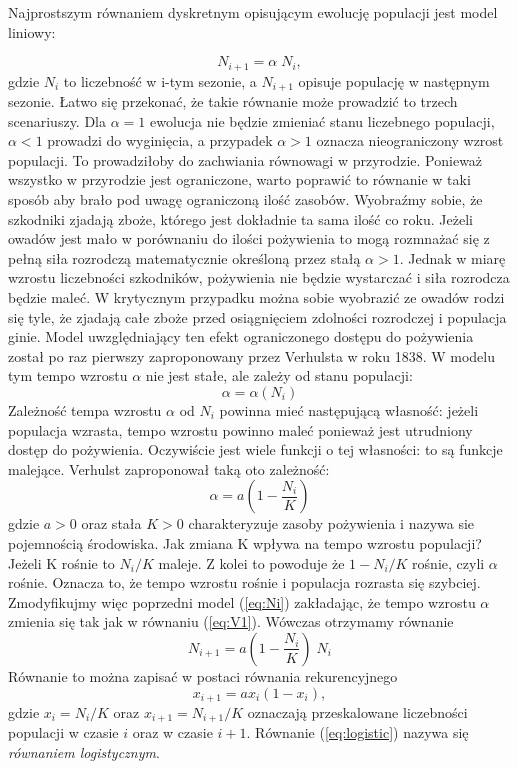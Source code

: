\documentclass[12pt]{article}
\begin{document}
Najprostszym równaniem dyskretnym opisującym ewolucję populacji jest
model liniowy:

\begin{equation}
\label{eq:Ni}
N_{i+1} = \alpha \; N_{i},
\end{equation}
%
gdzie $N_i$ to liczebność w i-tym sezonie, a $N_{i+1}$ opisuje
populację w następnym sezonie. Łatwo się przekonać, że takie równanie
może prowadzić to trzech scenariuszy.  Dla $\alpha=1$ ewolucja nie
będzie zmieniać stanu liczebnego populacji, $\alpha<1$ prowadzi do
wyginięcia, a przypadek $\alpha>1$ oznacza nieograniczony wzrost
populacji. To prowadziłoby do zachwiania równowagi w
przyrodzie. Ponieważ wszystko w przyrodzie jest ograniczone, warto
poprawić to równanie w taki sposób aby brało pod uwagę ograniczoną
ilość zasobów. Wyobraźmy sobie, że szkodniki zjadają zboże, którego
jest dokładnie ta sama ilość co roku. Jeżeli owadów jest mało w
porównaniu do ilości pożywienia to mogą rozmnażać się z pełną siła
rozrodczą matematycznie określoną przez stałą $\alpha>1$. Jednak w
miarę wzrostu liczebności szkodników, pożywienia nie będzie wystarczać
i siła rozrodcza będzie maleć. W krytycznym przypadku można sobie
wyobrazić ze owadów rodzi się tyle, że zjadają całe zboże przed
osiągnięciem zdolności rozrodczej i populacja ginie.  Model
uwzględniający ten efekt ograniczonego dostępu do pożywienia został po
raz pierwszy zaproponowany przez Verhulsta w roku 1838. W modelu tym
tempo wzrostu $\alpha$ nie jest stałe, ale zależy od stanu populacji:
%
\begin{equation}
\label{eq:V}
\alpha = \alpha( N_{i} )
\end{equation}
%
Zależność tempa wzrostu $\alpha$ od $N_i$ powinna mieć następującą
własność: jeżeli populacja wzrasta, tempo wzrostu powinno maleć
ponieważ jest utrudniony dostęp do pożywienia. Oczywiście jest wiele
funkcji o tej własności: to są funkcje malejące. Verhulst zaproponował
taką oto zależność:
%
\begin{equation}
\label{eq:V1}
\alpha = a \left(1-\frac{N_{i}}{K} \right)
\end{equation}
%
gdzie $a>0$ oraz stała $K>0$ charakteryzuje zasoby pożywienia i nazywa
sie pojemnością środowiska. Jak zmiana K wpływa na tempo wzrostu
populacji? Jeżeli K rośnie to $N_i/K$ maleje. Z kolei to powoduje że
$1-N_i/K$ rośnie, czyli $\alpha$ rośnie. Oznacza to, że tempo wzrostu
rośnie i populacja rozrasta się szybciej.  Zmodyfikujmy więc poprzedni
model (\ref{eq:Ni}) zakładając, że tempo wzrostu $\alpha$ zmienia się
tak jak w równaniu (\ref{eq:V1}). Wówczas otrzymamy równanie
%
\begin{equation}
\label{eq:N2i}
N_{i+1} = a \left(1-\frac{N_{i}}{K} \right) \; N_{i}
\end{equation}
%
Równanie to można zapisać w postaci równania rekurencyjnego
%
\begin{equation}
x_{i+1} = a x_{i} (1 - x_{i}),
\label{eq:logistic}
\end{equation}
%
gdzie $x_i = N_i/K$ oraz $x_{i+1} = N_{i+1}/K$ oznaczają przeskalowane
liczebności populacji w czasie $i$ oraz w czasie $i+1$. Równanie (\ref{eq:logistic})
nazywa się {\em równaniem logistycznym}.
\end{document}

